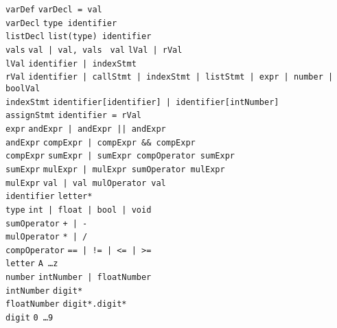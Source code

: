\documentclass{article}
\newcommand{\keyword}[1]{\colorbox{light-gray}{\texttt{#1}}}
\newcommand{\code}[1]{\texttt{#1}}
\begin{document}
\code{varDef} \textrightarrow \code{varDecl \keyword{=} val} \\
\code{varDecl} \textrightarrow \code{type identifier} \\
\code{listDecl} \textrightarrow \code{\keyword{list(}type\keyword{)} identifier} \\
\code{vals} \textrightarrow \code{val | val, vals }
\code{val} \textrightarrow \code{lVal | rVal} \\
\code{lVal} \textrightarrow \code{identifier | indexStmt} \\
\code{rVal} \textrightarrow \code{identifier | callStmt | indexStmt | listStmt | expr | number | boolVal} \\
\code{indexStmt} \textrightarrow \code{identifier\keyword{[}identifier\keyword{]} | identifier\keyword{[}intNumber\keyword{]}} \\
\code{assignStmt} \textrightarrow \code{identifier \keyword{=} rVal} \\

\code{expr} \textrightarrow \code{andExpr | andExpr \keyword{||} andExpr} \\
\code{andExpr} \textrightarrow \code{compExpr | compExpr \keyword{\&\&} compExpr} \\
\code{compExpr} \textrightarrow \code{sumExpr | sumExpr compOperator sumExpr} \\
\code{sumExpr} \textrightarrow \code{mulExpr | mulExpr sumOperator mulExpr} \\
\code{mulExpr} \textrightarrow \code{val | val mulOperator val} \\

\code{identifier} \textrightarrow \code{letter*} \\
\code{type} \textrightarrow \code{\keyword{int} | \keyword{float} | \keyword{bool} | \keyword{void}} \\
\code{sumOperator} \textrightarrow \code{\keyword{+} | \keyword{-}} \\
\code{mulOperator} \textrightarrow \code{\keyword{*} | \keyword{/}} \\
\code{compOperator} \textrightarrow \code{\keyword{==} | \keyword{!=} | \keyword{<=} | \keyword{>=}} \\
\code{letter} \textrightarrow \code{\keyword{A} \ldots \keyword{z}} \\
\code{number} \textrightarrow \code{intNumber | floatNumber} \\
\code{intNumber} \textrightarrow \code{digit*} \\
\code{floatNumber} \textrightarrow \code{digit*.digit*} \\
\code{digit} \textrightarrow \code{\keyword{0} \ldots \keyword{9}} \\
\end{document}
